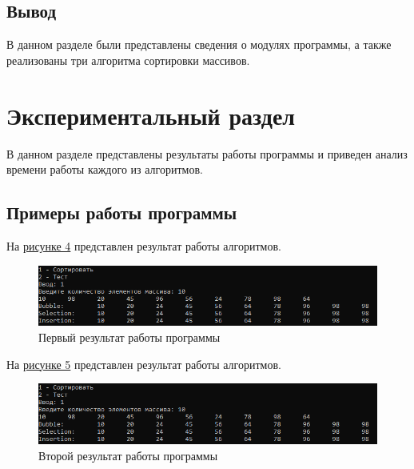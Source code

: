 \documentclass[14pt, a4paper]{extarticle}
\begin{document}
\subsection{Вывод}
В данном разделе были представлены сведения о модулях программы, а также реализованы три алгоритма сортировки массивов.

\clearpage
\section{Экспериментальный раздел}
В данном разделе представлены результаты работы программы и приведен анализ времени работы каждого из алгоритмов.
\subsection{Примеры работы программы}
На \hyperref[Result1]{рисунке 4} представлен результат работы алгоритмов.
\begin{figure}[h!]
	\centering
	\includegraphics[scale=0.9]{source/Result1.png}
	\caption{Первый результат работы программы}
	\label{Result1}
\end{figure}\par
На \hyperref[Result2]{рисунке 5} представлен результат работы алгоритмов.
\begin{figure}[h!]
	\centering
	\includegraphics[scale=0.9]{source/Result1.png}
	\caption{Второй результат работы программы}
	\label{Result2}
\end{figure}
\clearpage
\end{document}
